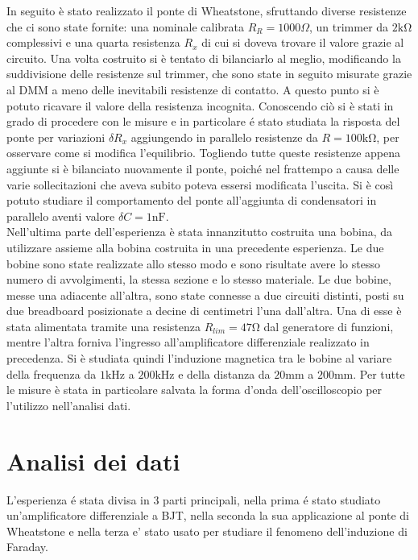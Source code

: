 \documentclass{article}
\begin{document}
In seguito è stato realizzato il ponte di Wheatstone, sfruttando diverse resistenze che ci sono state fornite: una nominale calibrata $R_R = 1000 \Omega$, un trimmer da $2 \si{\kilo\ohm}$ complessivi e una quarta resistenza $R_x$ di cui si doveva trovare il valore grazie al circuito. Una volta costruito si è tentato di bilanciarlo al meglio, modificando la suddivisione delle resistenze sul trimmer, che sono state in seguito misurate grazie al DMM a meno delle inevitabili resistenze di contatto. A questo punto si è potuto ricavare il valore della resistenza incognita. Conoscendo ciò si è stati in grado di procedere con le misure e in particolare \'e stato studiata la risposta del ponte per variazioni $\delta R_x$ aggiungendo in parallelo resistenze da $R = 100 \si{\kilo\ohm}$, per osservare come si modifica l'equilibrio. Togliendo tutte queste resistenze appena aggiunte si è bilanciato nuovamente il ponte, poiché nel frattempo a causa delle varie sollecitazioni che aveva subito poteva essersi modificata l'uscita. Si è così potuto studiare il comportamento del ponte all'aggiunta di condensatori in parallelo aventi valore $\delta C = 1 \si{\nano\farad}$.\\

Nell'ultima parte dell'esperienza è stata innanzitutto costruita una bobina, da utilizzare assieme alla bobina costruita in una precedente esperienza. Le due bobine sono state realizzate allo stesso modo e sono risultate avere lo stesso numero di avvolgimenti, la stessa sezione e lo stesso materiale. Le due bobine, messe una adiacente all'altra, sono state connesse a due circuiti distinti, posti su due breadboard posizionate a decine di centimetri l'una dall'altra. Una di esse è stata alimentata tramite una resistenza $R_{lim}=47 \si{\ohm}$ dal generatore di funzioni, mentre l'altra forniva l'ingresso all'amplificatore differenziale realizzato in precedenza. Si è studiata quindi l'induzione magnetica tra le bobine al variare della frequenza da $1\si{\kilo\hertz}$ a $200\si{\kilo\hertz}$ e della distanza da $20 \si{\milli\meter}$ a $200 \si{\milli\meter}$. Per tutte le misure è stata in particolare salvata la forma d'onda dell'oscilloscopio per l'utilizzo nell'analisi dati.

\newpage

\section{Analisi dei dati}
L'esperienza \'e stata divisa in 3 parti principali, nella prima \'e stato studiato un'amplificatore differenziale a BJT, nella seconda la sua applicazione al ponte di Wheatstone e nella terza e' stato usato per studiare il fenomeno dell'induzione di Faraday.
\end{document}

